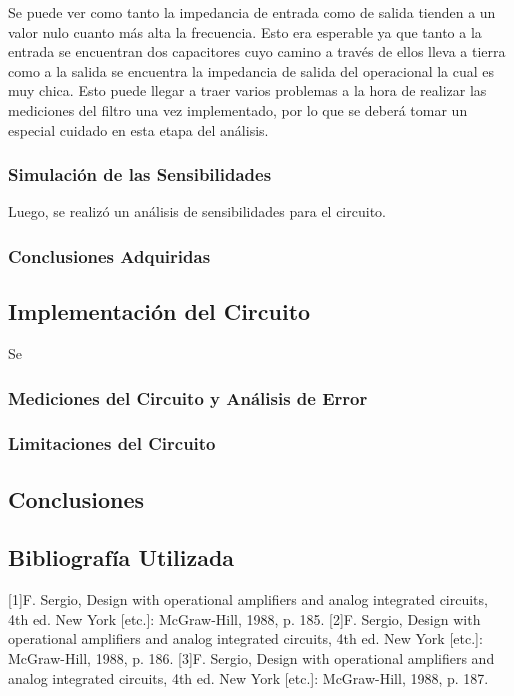 \documentclass[a4paper]{article}
\begin{document}
Se puede ver como tanto la impedancia de entrada como de salida tienden a un valor nulo cuanto más alta la frecuencia. Esto era esperable ya que tanto a la entrada se encuentran dos capacitores cuyo camino a través de ellos lleva a tierra como a la salida se encuentra la impedancia de salida del operacional la cual es muy chica. Esto puede llegar a traer varios problemas a la hora de realizar las mediciones del filtro una vez implementado, por lo que se deberá tomar un especial cuidado en esta etapa del análisis. 

\subsubsection{Simulación de las Sensibilidades}
Luego, se realizó un análisis de sensibilidades para el circuito.


\subsubsection{Conclusiones Adquiridas}



\subsection{Implementación del Circuito}
Se 
\subsubsection{Mediciones del Circuito y Análisis de Error}
\subsubsection{Limitaciones del Circuito}
\label{sec:limitaciones}

\subsection{Conclusiones}

\subsection{Bibliografía Utilizada}
[1]F. Sergio, Design with operational amplifiers and analog integrated circuits, 4th ed. New York [etc.]: McGraw-Hill, 1988, p. 185.
[2]F. Sergio, Design with operational amplifiers and analog integrated circuits, 4th ed. New York [etc.]: McGraw-Hill, 1988, p. 186.
[3]F. Sergio, Design with operational amplifiers and analog integrated circuits, 4th ed. New York [etc.]: McGraw-Hill, 1988, p. 187.
\end{document}
